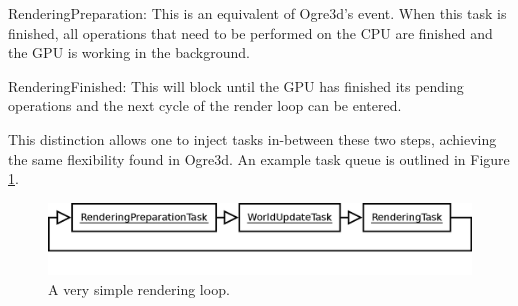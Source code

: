 		\begin{smalllist}
			\item RenderingPreparation: This  is an equivalent of Ogre3d's  event. When this task is finished, all operations that need to be performed on the CPU are finished and the GPU is working in the background.
			\item RenderingFinished: This  will block until the GPU has finished its pending operations and the next cycle of the render loop can be entered.
		\end{smalllist}
		
		This distinction allows one to inject tasks in-between these two steps, achieving the same flexibility found in Ogre3d. An example task queue is outlined in Figure \ref{fig:TaskQueue}.

		\begin{figure}[htbp]
			\centering
			\includegraphics[width=12cm]{images/TaskQueue.png}
			\caption{A very simple rendering loop.}
			\label{fig:TaskQueue}
		\end{figure}

